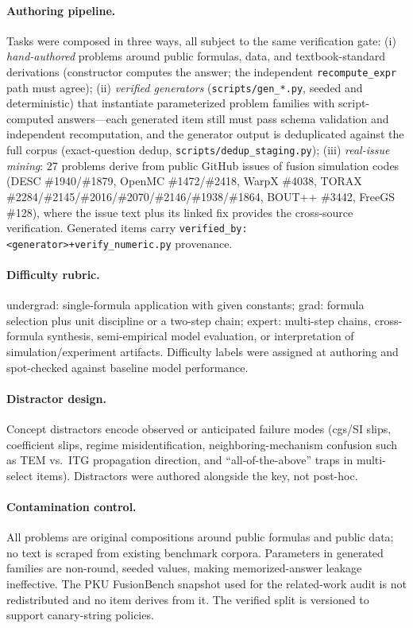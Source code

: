 \paragraph{Authoring pipeline.} Tasks were composed in three ways, all subject to the same verification gate: (i) \emph{hand-authored} problems around public formulas, data, and textbook-standard derivations (constructor computes the answer; the independent \texttt{recompute\_expr} path must agree); (ii) \emph{verified generators} (\texttt{scripts/gen\_*.py}, seeded and deterministic) that instantiate parameterized problem families with script-computed answers---each generated item still must pass schema validation and independent recomputation, and the generator output is deduplicated against the full corpus (exact-question dedup, \texttt{scripts/dedup\_staging.py}); (iii) \emph{real-issue mining}: 27 problems derive from public GitHub issues of fusion simulation codes (DESC \#1940/\#1879, OpenMC \#1472/\#2418, WarpX \#4038, TORAX \#2284/\#2145/\#2016/\#2070/\#2146/\#1938/\#1864, BOUT++ \#3442, FreeGS \#128), where the issue text plus its linked fix provides the cross-source verification. Generated items carry \texttt{verified\_by: <generator>+verify\_numeric.py} provenance.

\paragraph{Difficulty rubric.} undergrad: single-formula application with given constants; grad: formula selection plus unit discipline or a two-step chain; expert: multi-step chains, cross-formula synthesis, semi-empirical model evaluation, or interpretation of simulation/experiment artifacts. Difficulty labels were assigned at authoring and spot-checked against baseline model performance.

\paragraph{Distractor design.} Concept distractors encode observed or anticipated failure modes (cgs/SI slips, coefficient slips, regime misidentification, neighboring-mechanism confusion such as TEM vs.\ ITG propagation direction, and ``all-of-the-above'' traps in multi-select items). Distractors were authored alongside the key, not post-hoc.

\paragraph{Contamination control.} All problems are original compositions around public formulas and public data; no text is scraped from existing benchmark corpora. Parameters in generated families are non-round, seeded values, making memorized-answer leakage ineffective. The PKU FusionBench snapshot used for the related-work audit is not redistributed and no item derives from it. The verified split is versioned to support canary-string policies.

